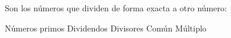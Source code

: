 
\question Son los números que dividen de forma exacta a otro número:

  \begin{oneparchoices}
    \choice Números primos
    \choice Dividendos
    \CorrectChoice Divisores
    \choice Común Múltiplo
  \end{oneparchoices}

